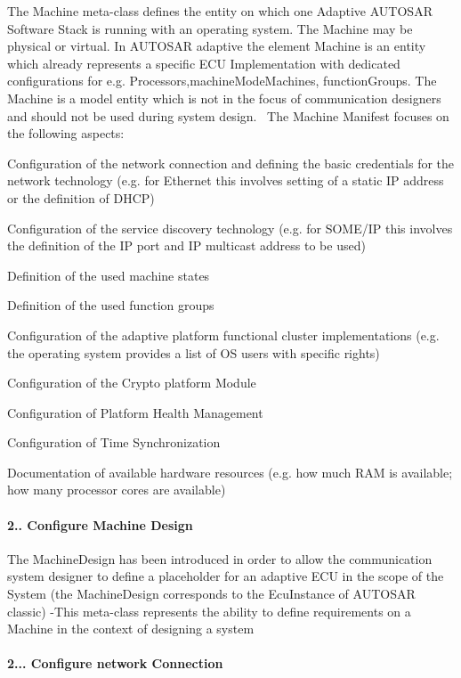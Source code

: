 The Machine meta-\/class defines the entity on which one Adaptive A\+U\+T\+O\+S\+AR Software Stack is running with an operating system. The Machine may be physical or virtual. In A\+U\+T\+O\+S\+AR adaptive the element Machine is an entity which already represents a specific E\+CU Implementation with dedicated configurations for e.\+g. Processors,machine\+Mode\+Machines, function\+Groups. The Machine is a model entity which is not in the focus of communication designers and should not be used during system design.~\newline
 The Machine Manifest focuses on the following aspects\+:
\begin{DoxyItemize}
\item Configuration of the network connection and defining the basic credentials for the network technology (e.\+g. for Ethernet this involves setting of a static IP address or the definition of D\+H\+CP)
\item Configuration of the service discovery technology (e.\+g. for S\+O\+M\+E/\+IP this involves the definition of the IP port and IP multicast address to be used)
\item Definition of the used machine states
\item Definition of the used function groups
\item Configuration of the adaptive platform functional cluster implementations (e.\+g. the operating system provides a list of OS users with specific rights)
\item Configuration of the Crypto platform Module
\item Configuration of Platform Health Management
\item Configuration of Time Synchronization
\item Documentation of available hardware resources (e.\+g. how much R\+AM is available; how many processor cores are available)
\end{DoxyItemize}

\paragraph*{2.. Configure Machine Design}

The Machine\+Design has been introduced in order to allow the communication system designer to define a placeholder for an adaptive E\+CU in the scope of the System (the Machine\+Design corresponds to the Ecu\+Instance of A\+U\+T\+O\+S\+AR classic) -\/\+This meta-\/class represents the ability to define requirements on a Machine in the context of designing a system  \paragraph*{2... Configure network Connection}

